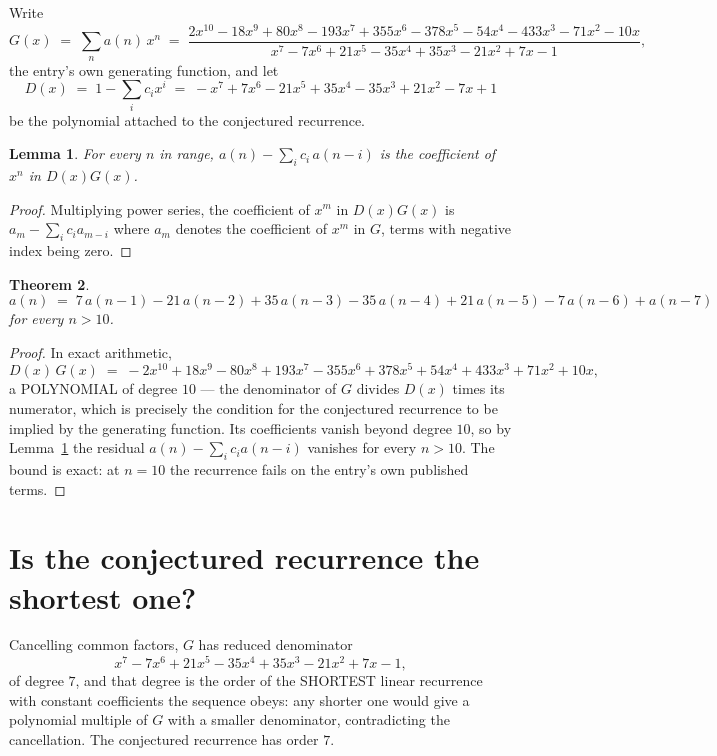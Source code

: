\documentclass[11pt,a4paper]{article}
\theoremstyle{plain}
\newtheorem{theorem}{Theorem}
\newtheorem{lemma}[theorem]{Lemma}
\theoremstyle{definition}
\begin{document}
Write
\[
G(x)\;=\;\sum_{n}a(n)\,x^{n}\;=\;\frac{2 x^{10} - 18 x^{9} + 80 x^{8} - 193 x^{7} + 355 x^{6} - 378 x^{5} - 54 x^{4} - 433 x^{3} - 71 x^{2} - 10 x}{x^{7} - 7 x^{6} + 21 x^{5} - 35 x^{4} + 35 x^{3} - 21 x^{2} + 7 x - 1},
\]
the entry's own generating function, and let
\[
D(x)\;=\;1-\sum_i c_i x^{i}\;=\;- x^{7} + 7 x^{6} - 21 x^{5} + 35 x^{4} - 35 x^{3} + 21 x^{2} - 7 x + 1
\]
be the polynomial attached to the conjectured recurrence.

\begin{lemma}\label{lem:key}
For every $n$ in range, $a(n)-\sum_i c_i\,a(n-i)$ is the coefficient of $x^{n}$ in
$D(x)G(x)$.
\end{lemma}

\begin{proof}
Multiplying power series, the coefficient of $x^{m}$ in $D(x)G(x)$ is
$a_m-\sum_i c_i a_{m-i}$ where $a_m$ denotes the coefficient of $x^{m}$ in $G$, terms with
negative index being zero.
\end{proof}

\begin{theorem}
\[
a(n)\;=\;7\,a(n-1) - 21\,a(n-2) + 35\,a(n-3) - 35\,a(n-4) + 21\,a(n-5) - 7\,a(n-6) + a(n-7)
\]
for every $n>10$.
\end{theorem}

\begin{proof}
In exact arithmetic,
\[
D(x)\,G(x)\;=\;- 2 x^{10} + 18 x^{9} - 80 x^{8} + 193 x^{7} - 355 x^{6} + 378 x^{5} + 54 x^{4} + 433 x^{3} + 71 x^{2} + 10 x,
\]
a POLYNOMIAL of degree $10$ --- the denominator of $G$ divides $D(x)$ times its numerator,
which is precisely the condition for the conjectured recurrence to be implied by the
generating function. Its coefficients vanish beyond degree $10$, so by
Lemma~\ref{lem:key} the residual $a(n)-\sum_ic_ia(n-i)$ vanishes for every
$n>10$. The bound is exact: at $n=10$ the recurrence fails on the entry's own published terms.
\end{proof}

\section{Is the conjectured recurrence the shortest one?}

Cancelling common factors, $G$ has reduced denominator
\[
x^{7} - 7 x^{6} + 21 x^{5} - 35 x^{4} + 35 x^{3} - 21 x^{2} + 7 x - 1,
\]
of degree $7$, and that degree is the order of the SHORTEST linear recurrence with
constant coefficients the sequence obeys: any shorter one would give a polynomial multiple of
$G$ with a smaller denominator, contradicting the cancellation. The conjectured recurrence has
order $7$.
\end{document}
